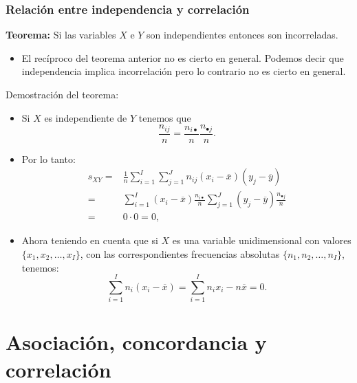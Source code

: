 \begin{frame}
\frametitle{Relación entre independencia y correlación}
\textbf{Teorema:}
Si las variables $X$ e $Y$  son independientes entonces son  incorreladas.

\begin{itemize}
\item El recíproco del teorema anterior no es cierto en general. Podemos decir que
independencia implica incorrelación pero lo contrario no es cierto en general.
\end{itemize}
\end{frame}

\begin{frame}
Demostración del teorema:
\begin{itemize}
\item Si $X$ es independiente de $Y$ tenemos que
$$
\frac{n_{ij}}{n}=\frac{n_{i\bullet}}{n} \frac{n_{\bullet j}}{n}.
$$
\item Por lo tanto:
$$
\begin{array}{rl}
s_{XY}=&\frac{1}{n}\sum\limits_{i=1}^I\sum\limits_{j=1}^{J}
n_{ij}\left(x_i-\overline{x}\right) \left(y_j-\overline{y}\right)\\
=&\sum\limits_{i=1}^I\left(x_i-\overline{x}\right)\frac{n_{i\bullet}}{n}
\sum\limits_{j=1}^J\left(y_j-\overline{y}\right)\frac{n_{\bullet j}}{n} \\ = & 0 \cdot 0
=0,
\end{array}
$$
\end{itemize}
\end{frame}

\begin{frame}
\begin{itemize}
\item Ahora teniendo en cuenta que si $X$ es una variable unidimensional con valores
\newline $\{x_1,x_2,\ldots, x_I\}$, con las correspondientes frecuencias
absolutas $\{n_1,n_2,\ldots, n_I\}$, tenemos:
$$
\sum\limits_{i=1}^I n_i\left(x_i-\overline{x}\right)= \sum\limits_{i=1}^I n_ix_i -
n\overline{x}=0.$$
\end{itemize}
\end{frame}

\section{Asociación, concordancia y correlación}

